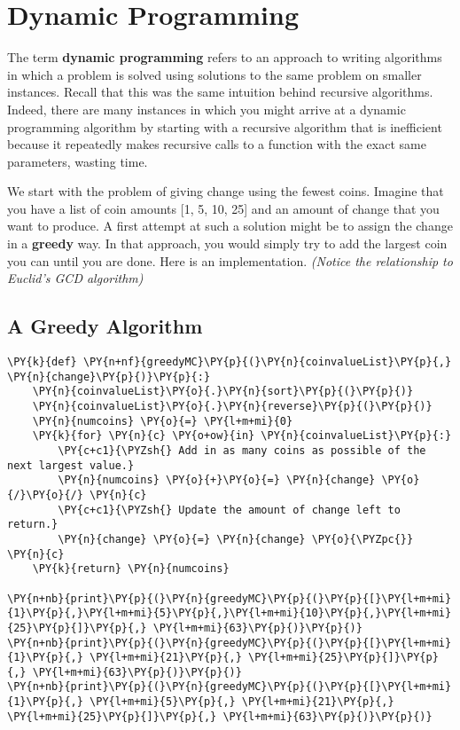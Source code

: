 \chapter{Dynamic Programming}


The term \textbf{dynamic programming} refers to an approach to writing algorithms in which a problem is solved using solutions to the same problem on smaller instances.
Recall that this was the same intuition behind recursive algorithms.
Indeed, there are many instances in which you might arrive at a dynamic programming algorithm by starting with a recursive algorithm that is inefficient because it repeatedly makes recursive calls to a function with the exact same parameters, wasting time.


We start with the problem of giving change using the fewest coins.  Imagine that you have a list of coin amounts [1, 5, 10, 25] and an amount of change that you want to produce.
A first attempt at such a solution might be to assign the change in a \textbf{greedy} way.
In that approach, you would simply try to add the largest coin you can until you are done.
Here is an implementation.  \emph{(Notice the relationship to Euclid's GCD algorithm)}

\section{A Greedy Algorithm}


\begin{Verbatim}[commandchars=\\\{\}]
\PY{k}{def} \PY{n+nf}{greedyMC}\PY{p}{(}\PY{n}{coinvalueList}\PY{p}{,} \PY{n}{change}\PY{p}{)}\PY{p}{:}
    \PY{n}{coinvalueList}\PY{o}{.}\PY{n}{sort}\PY{p}{(}\PY{p}{)}
    \PY{n}{coinvalueList}\PY{o}{.}\PY{n}{reverse}\PY{p}{(}\PY{p}{)}
    \PY{n}{numcoins} \PY{o}{=} \PY{l+m+mi}{0}
    \PY{k}{for} \PY{n}{c} \PY{o+ow}{in} \PY{n}{coinvalueList}\PY{p}{:}
        \PY{c+c1}{\PYZsh{} Add in as many coins as possible of the next largest value.}
        \PY{n}{numcoins} \PY{o}{+}\PY{o}{=} \PY{n}{change} \PY{o}{/}\PY{o}{/} \PY{n}{c}
        \PY{c+c1}{\PYZsh{} Update the amount of change left to return.}
        \PY{n}{change} \PY{o}{=} \PY{n}{change} \PY{o}{\PYZpc{}} \PY{n}{c}
    \PY{k}{return} \PY{n}{numcoins}

\PY{n+nb}{print}\PY{p}{(}\PY{n}{greedyMC}\PY{p}{(}\PY{p}{[}\PY{l+m+mi}{1}\PY{p}{,}\PY{l+m+mi}{5}\PY{p}{,}\PY{l+m+mi}{10}\PY{p}{,}\PY{l+m+mi}{25}\PY{p}{]}\PY{p}{,} \PY{l+m+mi}{63}\PY{p}{)}\PY{p}{)}
\PY{n+nb}{print}\PY{p}{(}\PY{n}{greedyMC}\PY{p}{(}\PY{p}{[}\PY{l+m+mi}{1}\PY{p}{,} \PY{l+m+mi}{21}\PY{p}{,} \PY{l+m+mi}{25}\PY{p}{]}\PY{p}{,} \PY{l+m+mi}{63}\PY{p}{)}\PY{p}{)}
\PY{n+nb}{print}\PY{p}{(}\PY{n}{greedyMC}\PY{p}{(}\PY{p}{[}\PY{l+m+mi}{1}\PY{p}{,} \PY{l+m+mi}{5}\PY{p}{,} \PY{l+m+mi}{21}\PY{p}{,} \PY{l+m+mi}{25}\PY{p}{]}\PY{p}{,} \PY{l+m+mi}{63}\PY{p}{)}\PY{p}{)}
\end{Verbatim}

